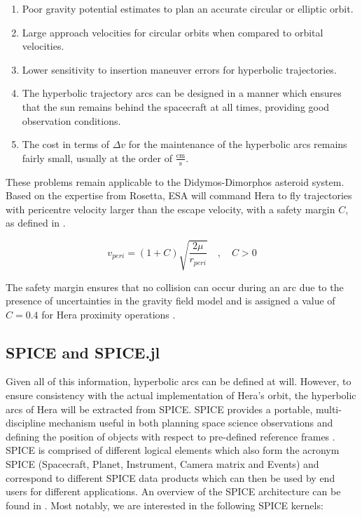 \begin{enumerate}
	\item Poor gravity potential estimates to plan an accurate circular or elliptic orbit.
	\item Large approach velocities for circular orbits when compared to orbital velocities.
	\item Lower sensitivity to insertion maneuver errors for hyperbolic trajectories. 
	\item The hyperbolic trajectory arcs can be designed in a manner which ensures that the sun remains behind the spacecraft at all times, providing good observation conditions. 
	\item The cost in terms of $\Delta v$ for the maintenance of the hyperbolic arcs remains fairly small, usually at the order of $\frac{\si{\centi\meter}}{\si{\second}}$.
\end{enumerate}

These problems remain applicable to the Didymos-Dimorphos asteroid system. Based on the expertise from Rosetta, ESA will command Hera to fly trajectories with pericentre velocity larger than the escape velocity, with a safety margin $C$, as defined in  \cite{hera-autonomous-ops}.

\begin{equation}
	\label{eq:hera_velocity}
	v_{p e r i}=(1+C) \sqrt{\frac{2 \mu}{r_{p e r i}}} \quad, \quad C>0
\end{equation}

The safety margin ensures that no collision can occur during an arc due to the presence of uncertainties in the gravity field model and is assigned a value of $C=0.4$ for Hera proximity operations \cite{hera-autonomous-ops}.

\subsection{SPICE and SPICE.jl}

Given all of this information, hyperbolic arcs can be defined at will. However, to ensure consistency with the actual implementation of Hera's orbit, the hyperbolic arcs of Hera will be extracted from SPICE. SPICE provides a portable, multi-discipline mechanism useful in both planning space science observations and defining the position of objects with respect to pre-defined reference frames \cite{SPICE}. SPICE is comprised of different logical elements which also form the acronym SPICE (Spacecraft, Planet, Instrument, Camera matrix and Events) and correspond to different SPICE data products which can then be used by end users for different applications\cite{SPICE}. An overview of the SPICE architecture can be found in . Most notably, we are interested in the following SPICE kernels:

